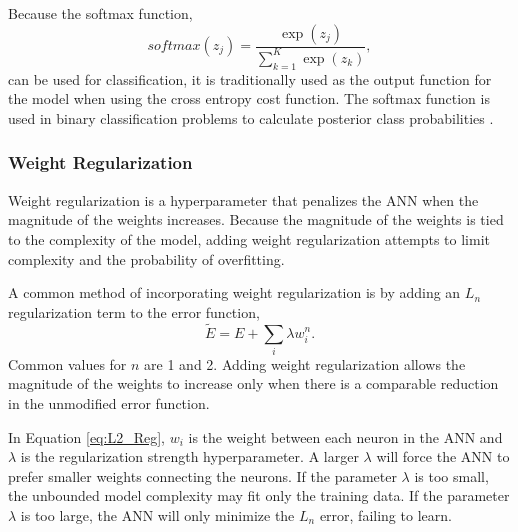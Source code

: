 Because the softmax function,
%
\begin{equation} \label{eq:softmax}
softmax(z_j) = \frac{\exp(z_j)} {\sum_{k=1}^{K} \exp(z_k)},
\end{equation}
%
can be used for classification, it is traditionally used as the output function for the model when using the cross entropy cost function. The softmax function is used in binary classification problems to calculate posterior class probabilities \cite{Bridle1990}.





\subsubsection{Weight Regularization}

Weight regularization is a hyperparameter that penalizes the ANN when the magnitude of the weights increases. Because the magnitude of the weights is tied to the complexity of the model, adding weight regularization attempts to limit complexity and the probability of overfitting.

A common method of incorporating weight regularization is by adding an $L_n$ regularization term to the error function, 
%
\begin{equation} \label{eq:L2_Reg}
\tilde{E} = E + \sum_i \lambda w_i^n.
\end{equation}
%
Common values for $n$ are 1 and 2. Adding weight regularization allows the magnitude of the weights to increase only when there is a comparable reduction in the unmodified error function.

In Equation \ref{eq:L2_Reg}, $w_i$ is the weight between each neuron in the ANN and $\lambda$ is the regularization strength hyperparameter. A larger $\lambda$ will force the ANN to prefer smaller weights connecting the neurons. If the parameter $\lambda$ is too small, the unbounded model complexity may fit only the training data. If the parameter $\lambda$ is too large, the ANN will only minimize the $L_n$ error, failing to learn.

